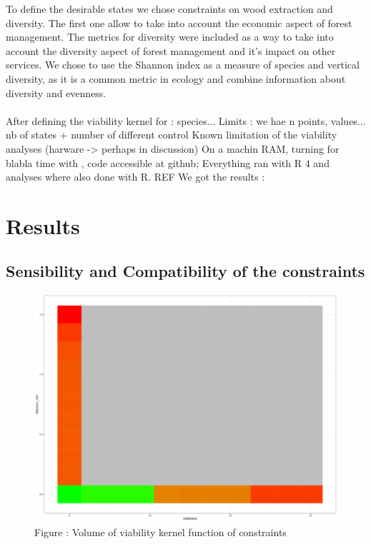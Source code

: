 \documentclass{article}
\begin{document}
To define the desirable states we chose constraints on wood extraction and diversity. The first one allow to take into account the economic aspect of forest management. The metrics for diversity were included as a way to take into account the diversity aspect of forest management and it's impact on other services. We chose to use the Shannon index as a measure of species and vertical diversity, as it is a common metric in ecology and combine information about diversity and evenness. \\
\\

After defining the viability kernel for : species...
Limits : we hae n points, values... nb of states + number of different control
Known limitation of the viability analyses (harware -> perhaps in discussion)
On a machin RAM, turning for blabla time with , code accessible at github; 
Everything ran with R 4 and analyses where also done with R. REF
We got the results :

\section{Results}

\subsection{Sensibility and Compatibility of the constraints}

\begin{figure}[h]
    \centering
    \includegraphics[width=\textwidth]{Figure/Sensi_ext_shvert.png}
    \caption{Figure : Volume of viability kernel function of constraints}
    \label{fig:sensi}
\end{figure}
\end{document}
